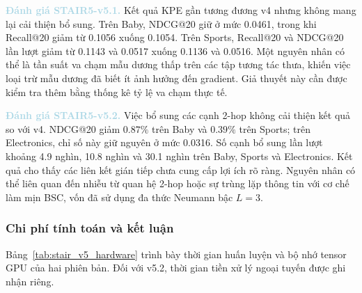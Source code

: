 \noindent\textcolor{lightblue}{\textbf{Đánh giá STAIR5-v5.1.}} Kết quả KPE gần tương đương v4 nhưng không mang lại cải thiện bổ sung. Trên Baby, NDCG@20 giữ ở mức 0.0461, trong khi Recall@20 giảm từ 0.1056 xuống 0.1054. Trên Sports, Recall@20 và NDCG@20 lần lượt giảm từ 0.1143 và 0.0517 xuống 0.1136 và 0.0516. Một nguyên nhân có thể là tần suất va chạm mẫu dương thấp trên các tập tương tác thưa, khiến việc loại trừ mẫu dương đã biết ít ảnh hưởng đến gradient. Giả thuyết này cần được kiểm tra thêm bằng thống kê tỷ lệ va chạm thực tế.

\noindent\textcolor{lightblue}{\textbf{Đánh giá STAIR5-v5.2.}} Việc bổ sung các cạnh 2-hop không cải thiện kết quả so với v4. NDCG@20 giảm $0.87\%$ trên Baby và $0.39\%$ trên Sports; trên Electronics, chỉ số này giữ nguyên ở mức 0.0316. Số cạnh bổ sung lần lượt khoảng 4.9 nghìn, 10.8 nghìn và 30.1 nghìn trên Baby, Sports và Electronics. Kết quả cho thấy các liên kết gián tiếp chưa cung cấp lợi ích rõ ràng. Nguyên nhân có thể liên quan đến nhiễu từ quan hệ 2-hop hoặc sự trùng lặp thông tin với cơ chế làm mịn BSC, vốn đã sử dụng đa thức Neumann bậc $L=3$.


\subsubsection{Chi phí tính toán và kết luận}

Bảng~\ref{tab:stair_v5_hardware} trình bày thời gian huấn luyện và bộ nhớ tensor GPU của hai phiên bản. Đối với v5.2, thời gian tiền xử lý ngoại tuyến được ghi nhận riêng.

\begin{table}[!htbp]
    \centering
    \caption{Chi phí thực thi của STAIR5-v5.1 và v5.2.}
    \label{tab:stair_v5_hardware}
    \footnotesize
    \renewcommand{\arraystretch}{1.15}
    \setlength{\tabcolsep}{4pt}

\end{table}

